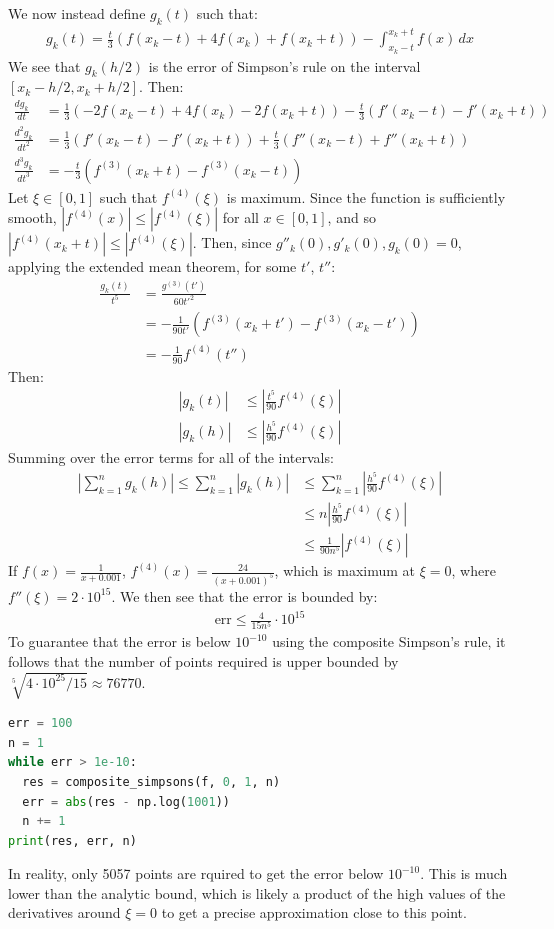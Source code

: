 \documentclass{article}
\begin{document}
We now instead define $g_k(t)$ such that:
\begin{align*}
    g_k(t) = \frac{t}{3}(f(x_k - t) + 4f(x_k) + f(x_k + t)) - \int_{x_k - t}^{x_k + t} f(x) \, dx
\end{align*} 
We see that $g_k(h/2)$ is the error of Simpson's rule on the interval $[x_k - h/2, x_k + h/2]$. Then:
\begin{align*}
    \frac{dg_k}{dt} & = \frac{1}{3}(-2f(x_k - t) + 4f(x_k) - 2f(x_k + t)) - \frac{t}{3}(f'(x_k - t) - f'(x_k + t)) \\
    \frac{d^2g_k}{dt^2} & = \frac{1}{3}(f'(x_k - t) - f'(x_k + t)) + \frac{t}{3}(f''(x_k - t) + f''(x_k + t)) \\
    \frac{d^3g_k}{dt^3} & = -\frac{t}{3}(f^{(3)}(x_k + t) - f^{(3)}(x_k - t))
\end{align*}
Let $\xi \in [0, 1]$ such that $f^{(4)}(\xi)$ is maximum. Since the function is sufficiently smooth, $|f^{(4)}(x)| \leq |f^{(4)}(\xi)|$ for all $x \in [0, 1]$, and so $|f^{(4)}(x_k + t)| \leq |f^{(4)}(\xi)|$. Then, since $g''_k(0), g'_k(0), g_k(0) = 0$, applying the extended mean theorem, for some $t'$, $t''$:
\begin{align*}
    \frac{g_k(t)}{t^5} & = \frac{g^{(3)}(t')}{60{t'}^2} \\
    & = -\frac{1}{90t'}(f^{(3)}(x_k + t') - f^{(3)}(x_k - t')) \\
    & = -\frac{1}{90}f^{(4)}(t'')
\end{align*}
Then:
\begin{align*}
    |g_k(t)| & \leq \left|\frac{t^5}{90}f^{(4)}(\xi)\right| \\
    |g_k(h)| & \leq \left|\frac{h^5}{90}f^{(4)}(\xi)\right|
\end{align*}
Summing over the error terms for all of the intervals:
\begin{align*}
    \left|\sum_{k=1}^n g_k(h) \right| \leq \sum_{k=1}^n |g_k(h)| & \leq \sum_{k=1}^n \left|\frac{h^5}{90}f^{(4)}(\xi)\right| \\
    & \leq n\left|\frac{h^5}{90}f^{(4)}(\xi)\right| \\
    & \leq \frac{1}{90n^5}\left|f^{(4)}(\xi)\right|
\end{align*}
If $f(x) = \frac{1}{x + 0.001}$, $f^{(4)}(x) = \frac{24}{(x + 0.001)^5}$, which is maximum at $\xi = 0$, where $f''(\xi) = 2 \cdot 10^{15}$. We then see that the error is bounded by:
\begin{align*}
    \textrm{err} \leq \frac{4}{15n^5} \cdot 10^{15}
\end{align*}
To guarantee that the error is below $10^{-10}$ using the composite Simpson's rule, it follows that the number of points required is upper bounded by $\sqrt[5]{4 \cdot 10^{25}/15} \approx 76770$.

\begin{lstlisting}[language=Python]
err = 100
n = 1
while err > 1e-10:
  res = composite_simpsons(f, 0, 1, n)
  err = abs(res - np.log(1001))
  n += 1
print(res, err, n)
\end{lstlisting}
In reality, only 5057 points are rquired to get the error below $10^{-10}$. This is much lower than the analytic bound, which is likely a product of the high values of the derivatives around $\xi = 0$ to get a precise approximation close to this point.
\end{document}
